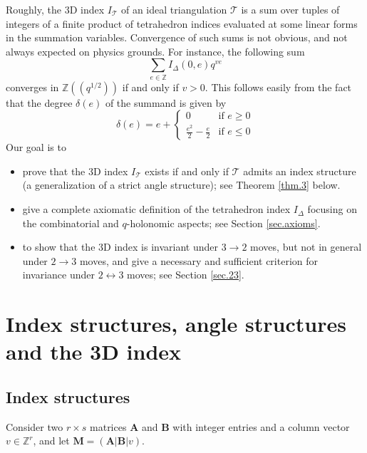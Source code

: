 \documentclass[12pt]{amsart}
\theoremstyle{definition}
\def\BZ{\mathbb Z}
\def\calT{\mathcal T}
\def\d{\delta}
\def\ID{I_{\Delta}}
\newcommand{\mb}{\mathbf}
\numberwithin{equation}{section}
\begin{document}
Roughly, the 3D index $I_{\calT}$ of an ideal triangulation $\calT$ is a sum over
tuples of integers of a finite product of tetrahedron indices evaluated at
some linear forms in the summation variables. Convergence of such sums
is not obvious, and not always expected on physics grounds. For instance,
the following sum
$$
\sum_{e \in \BZ} \ID(0,e) q^{v e}
$$
converges in $\BZ((q^{1/2}))$ if and only if $v >0$.
This follows easily from the fact that the degree $\d(e)$ of the summand 
is given by
$$
\d(e)=e + \begin{cases} 0 & \text{if} \,\,  e \geq 0 \\
\frac{e^2}{2}-\frac{e}{2} & \text{if} \,\,  e \leq 0
\end{cases}
$$ 
Our goal is to
\begin{itemize}
\item[(a)]
prove that the 3D index $I_{\calT}$ exists if and only if $\calT$
admits an index structure (a generalization of a strict angle structure); 
see Theorem \ref{thm.3} below.
\item[(b)]
give a complete axiomatic definition of the tetrahedron index
$\ID$ focusing on the combinatorial and $q$-holonomic aspects; see
Section \ref{sec.axioms}.
\item[(c)]
to show that the 3D index is invariant under $3 \to 2$ moves, but not
in general under $2 \to 3$ moves, and give a necessary and sufficient
criterion for invariance under $2 \leftrightarrow 3$ moves; see Section 
\ref{sec.23}.
\end{itemize}


\section{Index structures, angle structures and the 3D index}
\label{sec.results}

\subsection{Index structures}
\label{sub.index}

Consider two $r \times s$ matrices $\mb A$ and $\mb B$ with integer entries
and a column vector $v \in \BZ^r$, and let $\mb M=(\mb A | \mb B | v)$.
\end{document}
